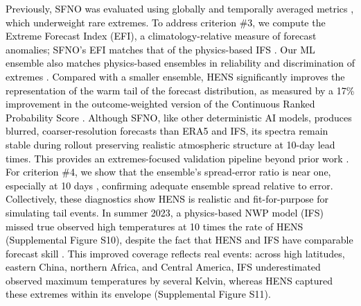 \documentclass[draft]{agujournal2019}
\newcommand{\newTxt}{\textcolor{black}}
\begin{document}
\newTxt{Previously, SFNO was evaluated using globally and temporally averaged metrics \citep{Bonev2023}, which underweight rare extremes. To address criterion \#3, we compute the Extreme Forecast Index (EFI), a climatology-relative measure of forecast anomalies; SFNO's EFI matches that of the physics-based IFS \citep[IFS;][]{ECMWF}. Our ML ensemble also matches physics-based ensembles in reliability and discrimination of extremes \citep{Mahesh2024hugeensemblesidesign}.  Compared with a smaller ensemble, HENS significantly improves the representation of the warm tail of the forecast distribution, as measured by a 17\% improvement in the outcome-weighted version of the Continuous Ranked Probability Score \citep{Mahesh2024hugeensemblespartii}. Although SFNO, like other deterministic AI models, produces blurred, coarser-resolution forecasts than ERA5 and IFS, its spectra remain stable during rollout \citep[unlike, e.g.,][]{Kochkov2024, Lang2024} preserving realistic atmospheric structure at 10-day lead times. This provides an extremes-focused validation pipeline beyond prior work \citep{Bonev2023}. For criterion \#4, we show that the ensemble's spread-error ratio is near one, especially at 10 days \citep{Mahesh2024hugeensemblesidesign}, confirming adequate ensemble spread relative to error.}
\newTxt{Collectively, these diagnostics show HENS is realistic and fit-for-purpose for simulating tail events. In summer 2023, a physics-based NWP model (IFS) missed true observed high temperatures at 10 times the rate of HENS (Supplemental Figure S10), despite the fact that HENS and IFS have comparable forecast skill \citep{Mahesh2024hugeensemblespartii}. This improved coverage reflects real events: across high latitudes, eastern China, northern Africa, and Central America, IFS underestimated observed maximum temperatures by several Kelvin, whereas HENS captured these extremes within its envelope (Supplemental Figure S11).}
\end{document}
